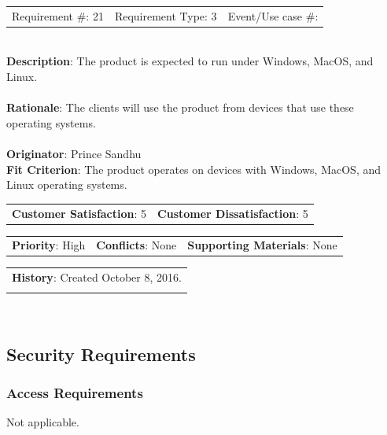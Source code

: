 \documentclass[12pt, titlepage]{article}
\begin{document}
\begin{reqbox}

\begin{tabular}{lll}
Requirement \#: 21 & Requirement Type: 3 & Event/Use case \#: \\
\end{tabular} \\

\textbf{Description}: The product is expected to run under Windows, MacOS, and Linux. \\ \\
\textbf{Rationale}: The clients will use the product from devices that use these operating systems. \\ \\
\textbf{Originator}: Prince Sandhu \\
\textbf{Fit Criterion}: The product operates on devices with Windows, MacOS, and Linux operating systems. \\

\begin{tabular}{ll}
\textbf{Customer Satisfaction}: 5 & \textbf{Customer Dissatisfaction}: 5 \\
\end{tabular}

\begin{tabular}{lll}
\textbf{Priority}: High & \textbf{Conflicts}: None & \textbf{Supporting Materials}: None \\
\end{tabular}

\begin{tabular}{l}
\textbf{History}: Created October 8, 2016.\\ \\
\end{tabular} \\

\end{reqbox}
\subsection{Security Requirements}

\subsubsection{Access Requirements}
Not applicable.
\end{document}
